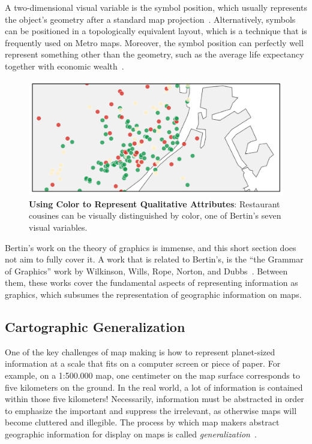 \documentclass[11pt, oneside]{report}
\begin{document}
{A two-dimensional visual variable is the symbol position, which usually represents the object's geometry after a standard map projection~\cite{snyder1997flattening}. Alternatively, symbols can be positioned in a topologically equivalent layout, which is a technique that is frequently used on Metro maps. Moreover, the symbol position can perfectly well represent something other than the geometry, such as the average life expectancy together with economic wealth~\cite{rosling2007poverty}. 

\begin{figure}[htbp]
\begin{center}
\includegraphics[scale=.7]{figs-thesis/restaurant-colors.pdf}
\caption{\textbf{Using Color to Represent Qualitative Attributes}: Restaurant cousines can be visually distinguished by color, one of Bertin's seven visual variables.}
\label{fig:introduction:restaurant:colors}
\end{center}
\vspace*{-4ex}
\end{figure}

Bertin's work on the theory of graphics is immense, and this short section does not aim to fully cover it. A work that is related to Bertin's, is the ``the Grammar of Graphics'' work by Wilkinson, Wills, Rope, Norton, and Dubbs~\cite{wilkinson2006grammar}. Between them, these works cover the fundamental aspects of representing information as graphics, which subsumes the representation of geographic information on maps.

\subsection{Cartographic Generalization}
\label{sec:introduction:map:generalization}
One of the key challenges of map making is how to represent planet-sized information at a scale that fits on a computer screen or piece of paper. For example, on a 1:500.000 map, one centimeter on the map surface corresponds to five kilometers on the ground. In the real world, a lot of information is contained within those five kilometers! Necessarily, information must be abstracted in order to emphasize the important and suppress the irrelevant, as otherwise maps will become cluttered and illegible. The process by which map makers abstract geographic information for display on maps is called \emph{generalization}~\cite{mcmaster1992generalization,weibel1997generalization}.

}
\end{document}
